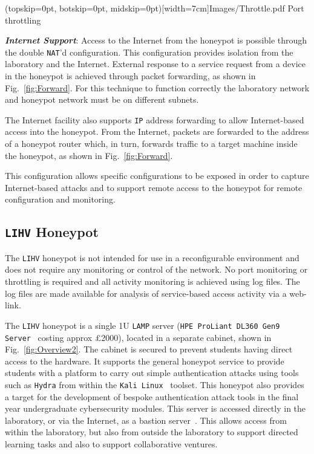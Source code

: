 \documentclass{ieeeaccess}
\begin{document}
\Figure[t!](topskip=0pt, botskip=0pt, midskip=0pt)[width=7cm]{Images/Throttle.pdf}
{Port throttling\label{fig:throttling}}


\noindent\textit{\textbf{Internet Support}}:
Access to the Internet from the honeypot is possible through the double
\texttt{NAT}'d configuration. This configuration provides isolation from the
laboratory and the Internet. External response to a service request from a
device in the honeypot is achieved through packet forwarding, as shown in
Fig.~\ref{fig:Forward}. For this technique to function correctly the laboratory
network and honeypot network must be on different subnets.

The Internet facility also supports \texttt{IP} address forwarding to allow
Internet-based access into the honeypot. From the Internet, packets are
forwarded to the address of a honeypot router which, in turn, forwards traffic
to a target machine inside the honeypot, as shown in Fig.~\ref{fig:Forward}.

This configuration allows specific configurations to be exposed in order to
capture Internet-based attacks and to support remote access to the honeypot for
remote configuration and monitoring.

\subsection{\texttt{LIHV} Honeypot}

The \texttt{LIHV} honeypot is not intended for use in a reconfigurable
environment and does not require any monitoring or control of the network. No
port monitoring or throttling is required and all activity monitoring is
achieved using log files. The log files are made available 
for analysis of service-based access activity via a web-link.

The \texttt{LIHV} honeypot is a single 1U \texttt{LAMP} server (\texttt{HPE
ProLiant DL360 Gen9 Server}~\cite{HPE:17} costing approx \pounds2000), located
in a separate cabinet, shown in Fig.~\ref{fig:Overview2}. The cabinet is
secured to prevent students having direct access to the hardware. It supports
the general honeypot service to provide students with a platform to carry out
simple authentication attacks using tools such as \texttt{Hydra} from within
the \texttt{Kali Linux}~\cite{OS:17} toolset. This honeypot also provides a
target for the development of bespoke authentication attack tools in the final
year undergraduate cybersecurity modules.  This server is accessed directly in
the laboratory, or via the Internet, as a bastion server~\cite{MB:05}. This
allows access from within the laboratory, but also from outside the laboratory
to support directed learning tasks and also to support collaborative ventures.
\end{document}
